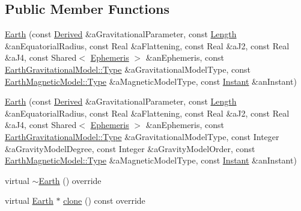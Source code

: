 \subsection*{Public Member Functions}
\begin{DoxyCompactItemize}
\item 
\hyperlink{classostk_1_1physics_1_1env_1_1obj_1_1celest_1_1_earth_ae3327b5673664451201468dd16667f42}{Earth} (const \hyperlink{classostk_1_1physics_1_1units_1_1_derived}{Derived} \&a\+Gravitational\+Parameter, const \hyperlink{classostk_1_1physics_1_1units_1_1_length}{Length} \&an\+Equatorial\+Radius, const Real \&a\+Flattening, const Real \&a\+J2, const Real \&a\+J4, const Shared$<$ \hyperlink{classostk_1_1physics_1_1env_1_1_ephemeris}{Ephemeris} $>$ \&an\+Ephemeris, const \hyperlink{classostk_1_1physics_1_1environment_1_1gravitational_1_1_earth_a9895df78b5c5aab5e981bf765f8c0f05}{Earth\+Gravitational\+Model\+::\+Type} \&a\+Gravitational\+Model\+Type, const \hyperlink{classostk_1_1physics_1_1environment_1_1magnetic_1_1_earth_a30a064d87b6fce338e76aebd3043b6b6}{Earth\+Magnetic\+Model\+::\+Type} \&a\+Magnetic\+Model\+Type, const \hyperlink{classostk_1_1physics_1_1time_1_1_instant}{Instant} \&an\+Instant)
\item 
\hyperlink{classostk_1_1physics_1_1env_1_1obj_1_1celest_1_1_earth_acf1ba88a7e9747779807a0ac676efc99}{Earth} (const \hyperlink{classostk_1_1physics_1_1units_1_1_derived}{Derived} \&a\+Gravitational\+Parameter, const \hyperlink{classostk_1_1physics_1_1units_1_1_length}{Length} \&an\+Equatorial\+Radius, const Real \&a\+Flattening, const Real \&a\+J2, const Real \&a\+J4, const Shared$<$ \hyperlink{classostk_1_1physics_1_1env_1_1_ephemeris}{Ephemeris} $>$ \&an\+Ephemeris, const \hyperlink{classostk_1_1physics_1_1environment_1_1gravitational_1_1_earth_a9895df78b5c5aab5e981bf765f8c0f05}{Earth\+Gravitational\+Model\+::\+Type} \&a\+Gravitational\+Model\+Type, const Integer \&a\+Gravity\+Model\+Degree, const Integer \&a\+Gravity\+Model\+Order, const \hyperlink{classostk_1_1physics_1_1environment_1_1magnetic_1_1_earth_a30a064d87b6fce338e76aebd3043b6b6}{Earth\+Magnetic\+Model\+::\+Type} \&a\+Magnetic\+Model\+Type, const \hyperlink{classostk_1_1physics_1_1time_1_1_instant}{Instant} \&an\+Instant)
\item 
virtual \hyperlink{classostk_1_1physics_1_1env_1_1obj_1_1celest_1_1_earth_ac718f964c68fa41331978751a9ca4818}{$\sim$\+Earth} () override
\item 
virtual \hyperlink{classostk_1_1physics_1_1env_1_1obj_1_1celest_1_1_earth}{Earth} $\ast$ \hyperlink{classostk_1_1physics_1_1env_1_1obj_1_1celest_1_1_earth_ae86664b9d6fc870baa1dac5c3219f784}{clone} () const override
\end{DoxyCompactItemize}
